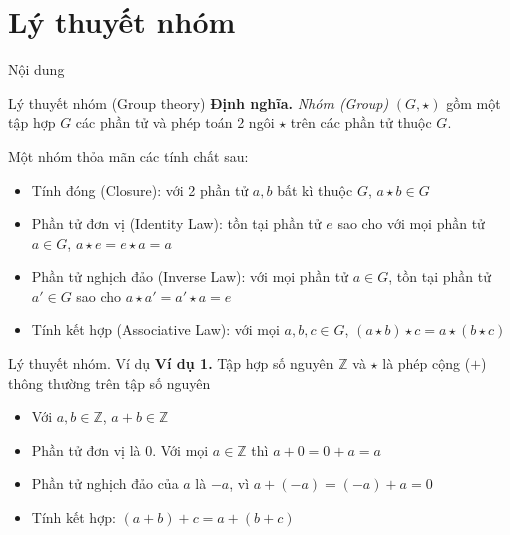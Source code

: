 \documentclass{beamer}
\begin{document}
\section{Lý thuyết nhóm}
\begin{frame}{Nội dung}
    \tableofcontents[
        currentsection,
        sectionstyle=show/shaded,
        subsectionstyle=show/show/hide
    ]
\end{frame}
\begin{frame}{Lý thuyết nhóm (Group theory)}
    \textbf{Định nghĩa.} \textit{Nhóm (Group)} $(G, \star)$ gồm một tập hợp $G$ các phần tử và phép toán 2 ngôi $\star$ trên các phần tử thuộc $G$.
    
    \pause
    Một nhóm thỏa mãn các tính chất sau:
    \begin{itemize}
        \item Tính đóng (Closure): với 2 phần tử $a, b$ bất kì thuộc $G$, $a\star b \in G$
        \item Phần tử đơn vị (Identity Law): tồn tại phần tử $e$ sao cho với mọi phần tử $a \in G$, $a \star e = e \star a = a$
        \item Phần tử nghịch đảo (Inverse Law): với mọi phần tử $a\in G$, tồn tại phần tử $a' \in G$ sao cho $a \star a' = a' \star a = e$
        \item Tính kết hợp (Associative Law): với mọi $a, b, c \in G$, $(a \star b) \star c = a \star (b \star c)$
    \end{itemize}
\end{frame}

\begin{frame}{Lý thuyết nhóm. Ví dụ}
    \textbf{Ví dụ 1.} Tập hợp số nguyên $\mathbb{Z}$ và $\star$ là phép cộng ($+$) thông thường trên tập số nguyên
    \pause
    \begin{itemize}
        \item Với $a, b \in \mathbb{Z}$, $a + b \in \mathbb{Z}$
        \item Phần tử đơn vị là 0. Với mọi $a \in \mathbb{Z}$ thì $a + 0 = 0 + a = a$
        \item Phần tử nghịch đảo của $a$ là $-a$, vì $a + (-a) = (-a) + a = 0$
        \item Tính kết hợp: $(a + b) + c = a + (b + c)$
    \end{itemize}
\end{frame}
\end{document}

